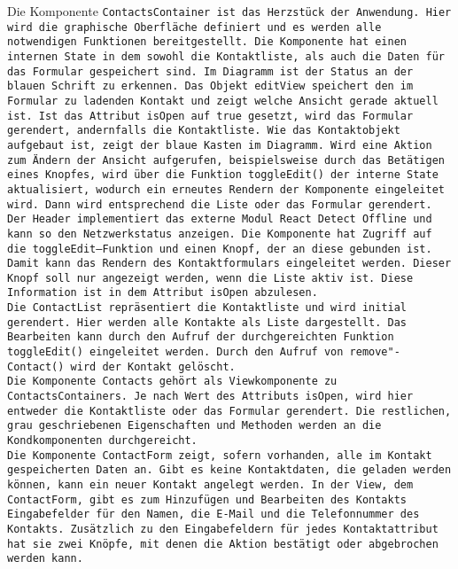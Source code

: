 %
%
Die Komponente \tt{ContactsContainer} ist das Herzstück der Anwendung.
Hier wird die graphische Oberfläche definiert und es werden alle notwendigen Funktionen bereitgestellt.
Die Komponente hat einen internen State in dem sowohl die Kontaktliste, als auch die Daten für das Formular gespeichert sind.
Im Diagramm ist der Status an der blauen Schrift zu erkennen.
Das Objekt \tt{editView} speichert den im Formular zu ladenden Kontakt und zeigt welche Ansicht gerade aktuell ist.
Ist das Attribut \tt{isOpen} auf \tt{true} gesetzt, wird das Formular gerendert, andernfalls die Kontaktliste.
Wie das Kontaktobjekt aufgebaut ist, zeigt der blaue Kasten im Diagramm.
Wird eine Aktion zum Ändern der Ansicht aufgerufen, beispielsweise durch das Betätigen eines Knopfes, wird über die Funktion \tt{toggleEdit()} der interne State aktualisiert, wodurch ein erneutes Rendern der Komponente eingeleitet wird. Dann wird entsprechend die Liste oder das Formular gerendert.\\
%
Der \tt{Header} implementiert das externe Modul React Detect Offline und kann so den Netzwerkstatus anzeigen.
Die Komponente hat Zugriff auf die \tt{toggleEdit}--Funktion und einen Knopf, der an diese gebunden ist.
Damit kann das Rendern des Kontaktformulars eingeleitet werden.
Dieser Knopf soll nur angezeigt werden, wenn die Liste aktiv ist. Diese Information ist in dem Attribut \tt{isOpen} abzulesen.\\
Die \tt{ContactList} repräsentiert die Kontaktliste und wird initial gerendert. Hier werden alle Kontakte als Liste dargestellt.
Das Bearbeiten kann durch den Aufruf der durchgereichten Funktion \tt{toggleEdit()} eingeleitet werden.
Durch den Aufruf von \tt{remove"-Contact()} wird der Kontakt gelöscht.\\
%
Die Komponente \tt{Contacts} gehört als Viewkomponente zu \tt{ContactsContainers}. Je nach Wert des Attributs \tt{isOpen}, wird hier entweder die Kontaktliste oder das Formular gerendert. Die restlichen, grau geschriebenen Eigenschaften und Methoden werden an die Kondkomponenten durchgereicht.\\
%
Die Komponente \tt{ContactForm} zeigt, sofern vorhanden, alle im Kontakt gespeicherten Daten an.
Gibt es keine Kontaktdaten, die geladen werden können, kann ein neuer Kontakt angelegt werden.
In der View, dem \tt{ContactForm}, gibt es zum Hinzufügen und Bearbeiten des Kontakts Eingabefelder für den Namen, die E-Mail und die Telefonnummer des Kontakts.
Zusätzlich zu den Eingabefeldern für jedes Kontaktattribut hat sie zwei Knöpfe, mit denen die Aktion bestätigt oder abgebrochen werden kann.\\
